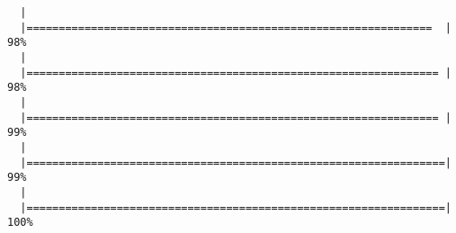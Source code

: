 \begin{knitrout}
\begin{kframe}
\begin{verbatim}
  |                                                                       
  |===============================================================  |  98%
  |                                                                       
  |================================================================ |  98%
  |                                                                       
  |================================================================ |  99%
  |                                                                       
  |=================================================================|  99%
  |                                                                       
  |=================================================================| 100%
\end{verbatim}
\end{kframe}
\end{knitrout}
